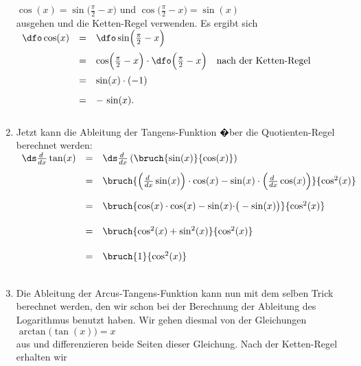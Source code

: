 \begin{enumerate}
      $\cos(x) = \sin\bigl(\frac{\pi}{2}- x\bigr)$ \quad und \quad $\cos(\frac{\pi}{2}- x\bigr) = \sin(x)$
      \\[0.3cm]
      ausgehen und die Ketten-Regel verwenden. Es ergibt sich
      \\[0.3cm]
      \hspace*{1.3cm}
      $
      \begin{array}[t]{lcll}
      \dfo\cos(x) & = & \dfo\sin\Bigl(\frac{\pi}{2}- x\Bigr) \\[0.3cm]
                 & = & \cos\Bigl(\frac{\pi}{2}- x\Bigr) \cdot \dfo\Bigl(\frac{\pi}{2}- x\Bigr) & \mbox{nach der Ketten-Regel} \\[0.3cm]
                 & = & \sin(x) \cdot (-1) \\[0.3cm]
                 & = & -\,\sin(x). \\[0.3cm]
      \end{array}$
\item Jetzt kann die Ableitung der Tangens-Funktion �ber die Quotienten-Regel berechnet 
      werden: 
      \\[0.3cm]
      \hspace*{1.3cm}
      $\displaystyle
      \begin{array}[t]{lcl}
      \ds \frac{d\;}{dx} \tan(x) & = & \ds\frac{d\;}{dx} \left(\bruch{\sin(x)}{\cos(x)}\right) \\[0.3cm]
      & = & \bruch{\Bigl(\frac{d\;}{dx} \sin(x)\Bigr) \cdot \cos(x) - \sin(x) \cdot \Bigl(\frac{d\;}{dx} \cos(x)\Bigr)}{\cos^2(x)} \\[0.5cm]
      & = & \bruch{\cos(x) \cdot \cos(x) - \sin(x) \cdot \bigr(-\sin(x)\bigr)}{\cos^2(x)} \\[0.5cm]
      & = & \bruch{\cos^2(x) + \sin^2(x)}{\cos^2(x)} \\[0.5cm]
      & = & \bruch{1}{\cos^2(x)} \\[0.5cm]
      \end{array}
      $
\item Die Ableitung der Arcus-Tangens-Funktion kann nun mit dem selben Trick berechnet werden,
      den wir schon bei der Berechnung der Ableitung des Logarithmus benutzt haben.
      Wir gehen diesmal von der Gleichungen 
      \\[0.2cm]
      \hspace*{1.3cm}
      $\arctan\bigl(\tan(x)\bigr) = x$
      \\[0.2cm]
      aus und differenzieren beide Seiten dieser Gleichung.  Nach der Ketten-Regel erhalten wir 
      \\[0.3cm]

\end{enumerate}
